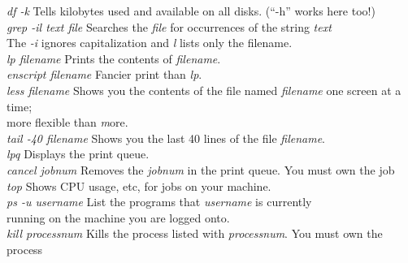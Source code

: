 \documentclass[psfig,preprint]{aastex}
\begin{document}
\begin{tabbing}
\textit{df -k} \> Tells kilobytes used and available on all
disks. (``-h'' works here too!)\\
\textit{grep -il text file} \> Searches the \textit{file} for occurrences of
the string \textit{text} \\
\> The {\it -i} ignores capitalization and {\it l} lists only the filename.\\
\textit{lp filename} \> Prints the contents of \textit{filename}. \\
\textit{enscript filename} \> Fancier print than {\it lp}. \\
\textit{less filename} \> Shows you the contents of the file named 
\textit{filename} one screen at a time; \\
\> more flexible than {\textit more}. \\
\textit{tail -40 filename} \> Shows you the last 40 lines of the file
{\it filename}. \\
\textit{lpq} \> Displays the print queue. \\
\textit{cancel jobnum} \> Removes the \textit{jobnum} in the print
queue. You must own the job \\

\textit{top} \> Shows CPU usage, etc, for jobs on your machine. \\
\textit{ps -u username} \> List the programs that \textit{username} is
currently \\
\>  running on the machine you are logged onto. \\
\textit{kill processnum} \> Kills the process listed with
\textit{processnum}. You must own the process \\
\end{tabbing}
	
\end{document}
